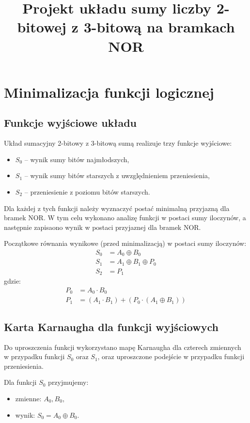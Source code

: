 \documentclass[11pt]{article}
\title{Projekt układu sumy liczby 2-bitowej z 3-bitową na bramkach NOR}
\author{}
\date{}
\begin{document}
\maketitle

\section{Minimalizacja funkcji logicznej}

\subsection{Funkcje wyjściowe układu}

Układ sumacyjny 2-bitowy z 3-bitową sumą realizuje trzy funkcje wyjściowe:
\begin{itemize}
    \item \(S_0\) -- wynik sumy bitów najmłodszych,
    \item \(S_1\) -- wynik sumy bitów starszych z uwzględnieniem przeniesienia,
    \item \(S_2\) -- przeniesienie z poziomu bitów starszych.
\end{itemize}

Dla każdej z tych funkcji należy wyznaczyć postać minimalną przyjazną dla bramek NOR. W tym celu wykonano analizę funkcji w postaci sumy iloczynów, a następnie zapisaono wynik w postaci przyjaznej dla bramek NOR.

Początkowe równania wynikowe (przed minimalizacją) w postaci sumy iloczynów:
\begin{align}
S_0 &= A_0 \oplus B_0 \\
S_1 &= A_1 \oplus B_1 \oplus P_0 \\
S_2 &= P_1
\end{align}
gdzie:
\begin{align}
P_0 &= A_0 \cdot B_0 \\
P_1 &= (A_1 \cdot B_1) + (P_0 \cdot (A_1 \oplus B_1))
\end{align}

\subsection{Karta Karnaugha dla funkcji wyjściowych}

Do uproszczenia funkcji wykorzystano mapę Karnaugha dla czterech zmiennych w przypadku funkcji \(S_0\) oraz \(S_1\), oraz uproszczone podejście w przypadku funkcji przeniesienia.

Dla funkcji \(S_0\) przyjmujemy:
\begin{itemize}
    \item zmienne: \(A_0, B_0\),
    \item wynik: \(S_0 = A_0 \oplus B_0\).
\end{itemize}
\end{document}
